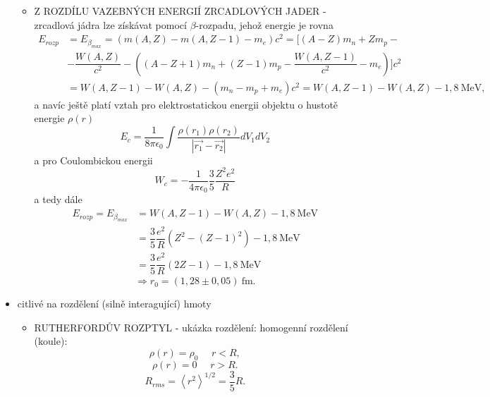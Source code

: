 \documentclass[../../main.tex]{subfiles}
\begin{document}
\begin{itemize}
\begin{itemize}
	    \item Z ROZDÍLU VAZEBNÝCH ENERGIÍ ZRCADLOVÝCH JADER - zrcadlová jádra lze získávat pomocí $\beta$-rozpadu, jehož energie je rovna
	    \begin{equation}
	    	\begin{aligned}
	    	E_{rozp} & = E_{\beta _{max}}= (m(A,Z) - m(A, Z-1) - m_e)c^2 =  [ (A-Z)m_n + Z m_p - \\
	    	&- \dfrac{W(A,Z)}{c^2} - \left( (A-Z+1)m_n + (Z-1)m_p - \dfrac{W(A,Z-1)}{c^2} - m_e\right) ] c^2 \\  
	    	& = W(A,Z-1) - W(A,Z) - (m_n - m_p + m_e)c^2 = W(A,Z-1) - W(A,Z) - 1,8 ~\mathrm{MeV},	
	    	\end{aligned}
	    \end{equation}	
	    a navíc ještě platí vztah pro elektrostatickou energii objektu o hustotě energie $\rho (r)$
	    \begin{equation}
	    E_c = \dfrac{1}{8 \pi \epsilon _0} \int \dfrac{\rho (r_1) \rho (r_2)}{|\vec{r_1} - \vec{r_2}|} dV_1 dV_2
	    \end{equation}	
	    a pro Coulombickou energii
	    \begin{equation}
	    W_c = - \dfrac{1}{4 \pi \epsilon _0} \dfrac{3}{5} \dfrac{Z^2 e^2}{R}
	    \end{equation}
	    a tedy dále 
	    \begin{equation}
	    \begin{aligned}
	    E_{rozp} = E_{\beta _{max}} & = W(A, Z-1) - W(A,Z) - 1,8~\mathrm{MeV} \\
	    & = \dfrac{3}{5} \dfrac{e^2}{R} (Z^2 - (Z-1)^2) - 1,8~\mathrm{MeV} \\
	    & = \dfrac{3}{5} \dfrac{e^2}{R} (2Z-1) - 1,8~\mathrm{MeV}
	    \end{aligned}
	    \end{equation}
	    \begin{equation}
	    \Rightarrow r_0 = (1,28 \pm 0,05)~\mathrm{fm}.
	    \end{equation}	
	
	\end{itemize}
	\item citlivé na rozdělení (silně interagující) hmoty
	\begin{itemize}
		\item RUTHERFORDŮV ROZPTYL - ukázka rozdělení: homogenní rozdělení (koule): 
		\begin{equation}
		\rho (r) = \rho _0 ~~~~~~ r < R,
		\end{equation}
		\begin{equation}
		\rho (r) = 0 ~~~~~~ r > R.
		\end{equation}
		\begin{equation}
		R_{rms} = \left\langle r^2 \right\rangle ^{1/2} = \dfrac{3}{5} R.
		\end{equation}
		

\end{itemize}
\end{itemize}
\end{document}
